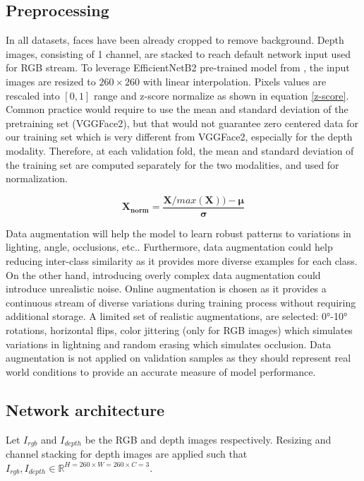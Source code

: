 \subsection{Preprocessing}

In all datasets, faces have been already cropped to remove background. Depth images, consisting of 1 channel, are stacked to reach default network input used for RGB stream. 
    To leverage EfficientNetB2 pre-trained model from \cite{RW_7_EFF1}, the input images are resized to $260 \times 260$ with linear interpolation.
    Pixels values are rescaled into $[0,1]$ range and z-score normalize as shown in equation \ref{z-score}. Common practice would require to use the mean and standard deviation of the pretraining set (VGGFace2), but that would not guarantee zero centered data for our training set which is very different from VGGFace2, especially for the depth modality. Therefore, at each validation fold, the mean and standard deviation of the training set are computed separately for the two modalities, and used for normalization.

    
\begin{equation}\label{z-score}%
    \bm{X_{norm}} = \frac{\bm{X}/max(\bm{X})) - \bm{\mu}}{\bm{\sigma}}
\end{equation}

Data augmentation will help the model to learn robust patterns to variations in lighting, angle, occlusions, etc.. Furthermore, data augmentation could help reducing inter-class similarity as it provides more diverse examples for each class. On the other hand, introducing overly complex data augmentation could introduce unrealistic noise. Online augmentation is chosen as it provides a continuous stream of diverse variations during training process without requiring additional storage. A limited set of realistic augmentations, are selected: 0°-10° rotations, horizontal flips, color jittering (only for RGB images) which simulates variations in lightning and random erasing which simulates occlusion. Data augmentation is not applied on validation samples as they should represent real world conditions to provide an accurate measure of model performance.


\subsection{Network architecture}

Let $I_{rgb}$ and $I_{depth}$ be the RGB and depth images respectively. Resizing and channel stacking for depth images are applied such that $I_{rgb}, I_{depth} \in \mathbb{R}^{H=260 \times W=260 \times C=3}$.

